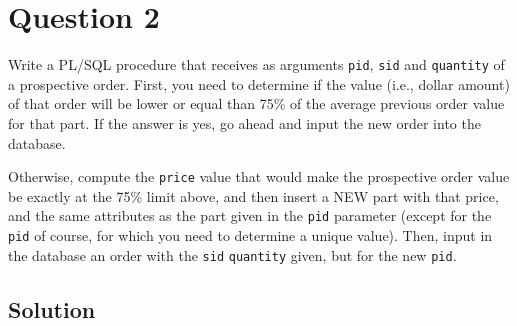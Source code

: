 
\section*{Question 2}

Write a PL/SQL procedure that receives as arguments \texttt{pid}, \texttt{sid} and \texttt{quantity} of a prospective order.
First, you need to determine if the value (i.e., dollar amount) of that order will be  lower or equal than 75\% of the average previous order value for that part. If the answer is yes, go ahead and input the new order into the database.

Otherwise, compute the \texttt{price} value that would make the prospective order value be exactly at the 75\% limit above, and then insert a NEW part with that price, and the same attributes as the part given in the \texttt{pid} parameter (except  for the \texttt{pid} of course, for which you need to determine a unique value). 
Then, input in the database an order with the \texttt{sid}  \texttt{quantity} given, but for the new \texttt{pid}. 

\subsection*{Solution}

\lstset{language=SQL}

